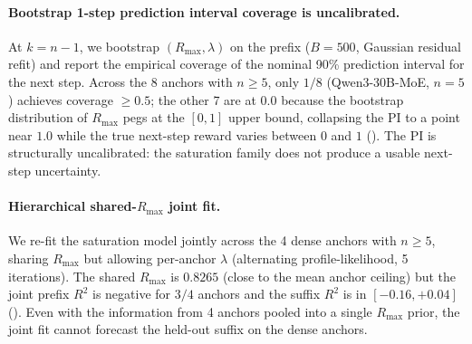 \paragraph{Bootstrap 1-step prediction interval coverage is uncalibrated.}
\label{par:scaling-iter77-coverage}
At $k = n-1$, we bootstrap $(R_\mathrm{max}, \lambda)$ on the prefix
($B=500$, Gaussian residual refit) and report the empirical coverage of the
nominal 90\% prediction interval for the next step.  Across the 8 anchors
with $n \geq 5$, only $1/8$ (Qwen3-30B-MoE, $n=5$) achieves coverage
$\geq 0.5$; the other 7 are at $0.0$ because the bootstrap distribution of
$R_\mathrm{max}$ pegs at the $[0,1]$ upper bound, collapsing the PI to a
point near $1.0$ while the true next-step reward varies between $0$ and $1$
().  The PI is structurally
uncalibrated: the saturation family does not produce a usable next-step
uncertainty.

\paragraph{Hierarchical shared-$R_\mathrm{max}$ joint fit.}
\label{par:scaling-iter77-hierarchical}
We re-fit the saturation model jointly across the 4 dense anchors with
$n \geq 5$, sharing $R_\mathrm{max}$ but allowing per-anchor $\lambda$
(alternating profile-likelihood, 5 iterations).  The shared $R_\mathrm{max}$
is $0.8265$ (close to the mean anchor ceiling) but the joint prefix
$R^2$ is negative for $3/4$ anchors and the suffix $R^2$ is in
$[-0.16, +0.04]$ ().  Even with the
information from 4 anchors pooled into a single $R_\mathrm{max}$ prior,
the joint fit cannot forecast the held-out suffix on the dense anchors.

